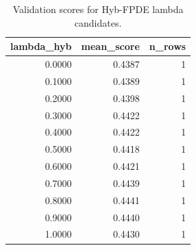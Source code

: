 \begin{table}[t]
\caption{Validation scores for Hyb-FPDE lambda candidates.}
\label{tab:lambda_distribution_computed}
\centering
\begin{tabular}{rrr}
\toprule
lambda\_hyb & mean\_score & n\_rows \\
\midrule
0.0000 & 0.4387 & 1 \\
0.1000 & 0.4389 & 1 \\
0.2000 & 0.4398 & 1 \\
0.3000 & 0.4422 & 1 \\
0.4000 & 0.4422 & 1 \\
0.5000 & 0.4418 & 1 \\
0.6000 & 0.4421 & 1 \\
0.7000 & 0.4439 & 1 \\
0.8000 & 0.4441 & 1 \\
0.9000 & 0.4440 & 1 \\
1.0000 & 0.4430 & 1 \\
\bottomrule
\end{tabular}

\end{table}
